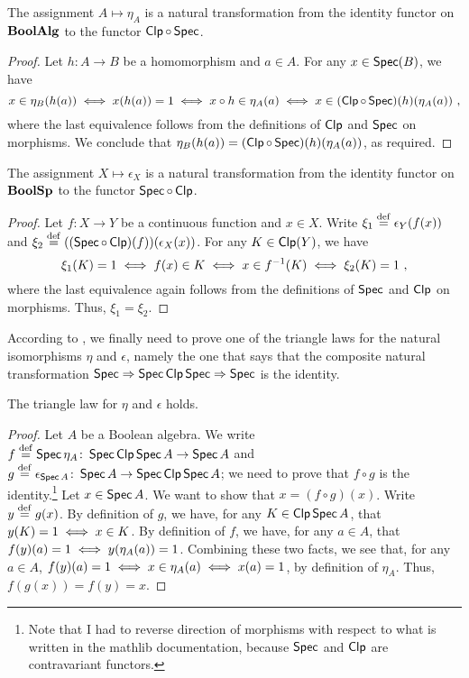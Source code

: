 \begin{proposition}\label{etanat}
    The assignment $A \mapsto \eta_A$ is a natural transformation from the
    identity functor on $\mathbf{BoolAlg}$ to the functor $\operatorname*{\mathsf{Clp}} \circ \operatorname*{\mathsf{Spec}}$.
\end{proposition}
\begin{proof}
    Let $h \colon A \to B$ be a homomorphism and $a \in A$. For any $x \in
    \operatorname*{\mathsf{Spec}}(B)$, we have
    \[ x \in \eta_B(h(a)) \iff x(h(a)) = 1 \iff x \circ h \in \eta_A(a) \iff
    x \in (\operatorname*{\mathsf{Clp}} \circ \operatorname*{\mathsf{Spec}})(h)(\eta_A(a)) \ , \]
    where the last equivalence follows from the definitions of $\operatorname*{\mathsf{Clp}}$ and
    $\operatorname*{\mathsf{Spec}}$ on morphisms. We conclude that $\eta_B(h(a)) = (\operatorname*{\mathsf{Clp}} \circ
    \operatorname*{\mathsf{Spec}})(h)(\eta_A(a))$, as required.
\end{proof}

\begin{proposition}\label{epsilonnat}
    The assignment $X \mapsto \epsilon_X$ is a natural transformation from the
    identity functor on $\mathbf{BoolSp}$ to the functor $\operatorname*{\mathsf{Spec}} \circ \operatorname*{\mathsf{Clp}}$.
\end{proposition}
\begin{proof}
    Let $f \colon X \to Y$ be a continuous function and $x \in X$. Write $\xi_1
    \stackrel{\mathrm{def}}{=} \epsilon_Y(f(x))$ and $\xi_2 \stackrel{\mathrm{def}}{=} ((\operatorname*{\mathsf{Spec}} \circ
    \operatorname*{\mathsf{Clp}})(f))(\epsilon_X(x))$. For any $K \in \operatorname*{\mathsf{Clp}}(Y)$, we have
    \[ \xi_1(K) = 1 \iff f(x) \in K \iff x \in f^{-1}(K) \iff
    \xi_2(K) = 1 \ , \]
    where the last equivalence again follows from the definitions of $\operatorname*{\mathsf{Spec}}$
    and $\operatorname*{\mathsf{Clp}}$ on morphisms. Thus, $\xi_1 = \xi_2$.
\end{proof}

According to
, we finally need to prove one
of the triangle laws for the natural isomorphisms $\eta$ and $\epsilon$, namely
the one that says that the composite natural transformation $\operatorname*{\mathsf{Spec}} \Rightarrow
\operatorname*{\mathsf{Spec}} \operatorname*{\mathsf{Clp}} \operatorname*{\mathsf{Spec}} \Rightarrow \operatorname*{\mathsf{Spec}}$ is the identity.
\begin{proposition}\label{triangle}
    The triangle law for $\eta$ and $\epsilon$ holds. 
\end{proposition}
\begin{proof}
    Let $A$ be a Boolean algebra. We write $f \stackrel{\mathrm{def}}{=} \operatorname*{\mathsf{Spec}} \eta_A \colon \operatorname*{\mathsf{Spec}}
    \operatorname*{\mathsf{Clp}} \operatorname*{\mathsf{Spec}} A \to \operatorname*{\mathsf{Spec}} A$ and $g \stackrel{\mathrm{def}}{=} \epsilon_{\operatorname*{\mathsf{Spec}} A} \colon \operatorname*{\mathsf{Spec}} A
    \to \operatorname*{\mathsf{Spec}} \operatorname*{\mathsf{Clp}} \operatorname*{\mathsf{Spec}} A$; we need to prove that $f \circ g$ is the
    identity.\footnote{
        Note that I had to reverse direction of morphisms with respect to what
        is written in the mathlib documentation, because $\operatorname*{\mathsf{Spec}}$ and $\operatorname*{\mathsf{Clp}}$ are
        contravariant functors.}
    Let $x \in \operatorname*{\mathsf{Spec}} A$. We want to show that $x = (f \circ g)(x)$.  Write $y
    \stackrel{\mathrm{def}}{=} g(x)$. By definition of $g$, we have, for any $K \in \operatorname*{\mathsf{Clp}} \operatorname*{\mathsf{Spec}} A$,
    that $y(K) = 1 \iff x \in K$. By definition of $f$, we have, for any $a
    \in A$, that $f(y)(a) = 1 \iff y(\eta_A(a)) = 1$. Combining these two
    facts, we see that, for any $a \in A$, $f(y)(a) = 1 \iff x \in \eta_A(a)
    \iff x(a) = 1$, by definition of $\eta_A$. Thus, $f(g(x)) = f(y) = x$.
\end{proof}


